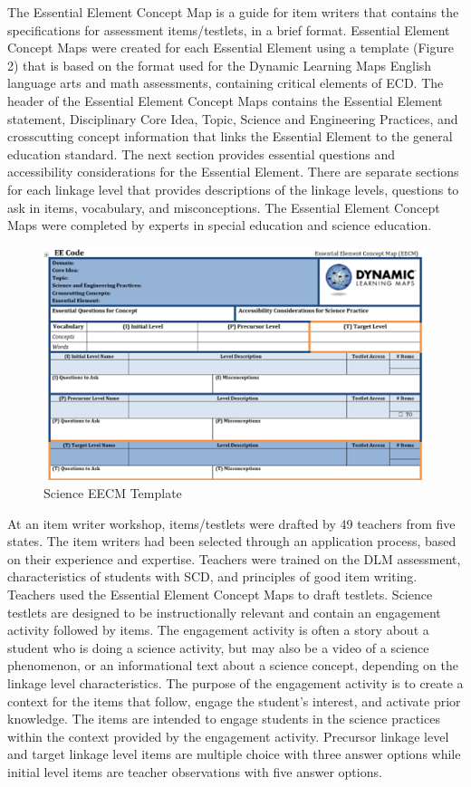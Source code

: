 \documentclass[11.5pt]{sig-alternate} %
\begin{document}
\begin{large}
The Essential Element Concept Map is a guide for item writers that contains the specifications for assessment items/testlets, in a brief format. Essential Element Concept Maps were created for each Essential Element using a template (Figure 2) that is based on the format used for the Dynamic Learning Maps English language arts and math assessments, containing critical elements of ECD. The header of the Essential Element Concept Maps contains the Essential Element statement, Disciplinary Core Idea, Topic, Science and Engineering Practices, and crosscutting concept information that links the Essential Element to the general education standard. The next section provides essential questions and accessibility considerations for the Essential Element. There are separate sections for each linkage level that provides descriptions of the linkage levels, questions to ask in items, vocabulary, and misconceptions. The Essential Element Concept Maps were completed by experts in special education and science education. 

\begin{figure}[ht]
    \centering
    \includegraphics[width=1\linewidth]{images/fig2.png}
    \caption{Science EECM Template}
\end{figure}

At an item writer workshop, items/testlets were drafted by 49 teachers from five states. The item writers had been selected through an application process, based on their experience and expertise. Teachers were trained on the DLM assessment, characteristics of students with SCD, and principles of good item writing. Teachers used the Essential Element Concept Maps to draft testlets. Science testlets are designed to be instructionally relevant and contain an engagement activity followed by items. The engagement activity is often a story about a student who is doing a science activity, but may also be a video of a science phenomenon, or an informational text about a science concept, depending on the linkage level characteristics. The purpose of the engagement activity is to create a context for the items that follow, engage the student's interest, and activate prior knowledge. The items are intended to engage students in the science practices within the context provided by the engagement activity. Precursor linkage level and target linkage level items are multiple choice with three answer options while initial level items are teacher observations with five answer options.


\end{large}
\end{document}
